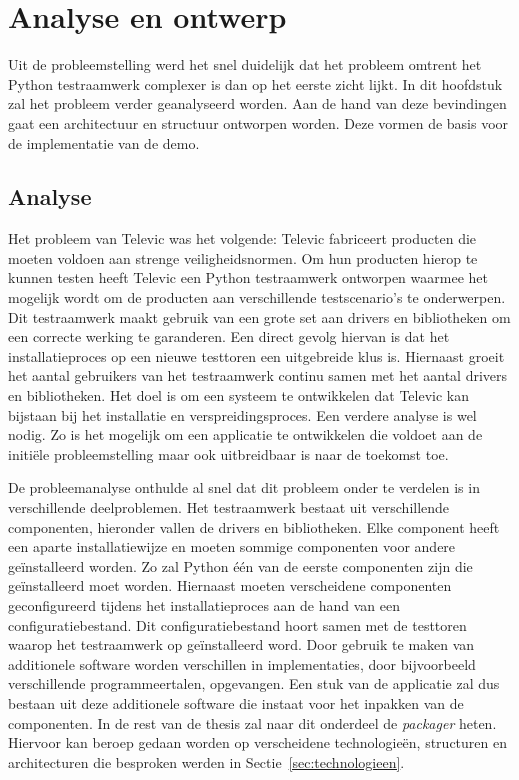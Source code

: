 \chapter{Analyse en ontwerp}\label{sec:anaEnOntwerp}
Uit de probleemstelling werd het snel duidelijk dat het probleem omtrent het Python testraamwerk complexer is dan op het eerste zicht lijkt.
In dit hoofdstuk zal het probleem verder geanalyseerd worden.
Aan de hand van deze bevindingen gaat een architectuur en structuur ontworpen worden.
Deze vormen de basis voor de implementatie van de demo.

\section{Analyse}
Het probleem van Televic was het volgende:
Televic fabriceert producten die moeten voldoen aan strenge veiligheidsnormen.
Om hun producten hierop te kunnen testen heeft Televic een Python testraamwerk ontworpen waarmee het mogelijk wordt om de producten aan verschillende testscenario's te onderwerpen.
Dit testraamwerk maakt gebruik van een grote set aan drivers en bibliotheken om een correcte werking te garanderen.
Een direct gevolg hiervan is dat het installatieproces op een nieuwe testtoren een uitgebreide klus is.
Hiernaast groeit het aantal gebruikers van het testraamwerk continu samen met het aantal drivers en bibliotheken.
Het doel is om een systeem te ontwikkelen dat Televic kan bijstaan bij het installatie en verspreidingsproces.
Een verdere analyse is wel nodig.
Zo is het mogelijk om een applicatie te ontwikkelen die voldoet aan de initiële probleemstelling maar ook uitbreidbaar is naar de toekomst toe.

De probleemanalyse onthulde al snel dat dit probleem onder te verdelen is in verschillende deelproblemen.
Het testraamwerk bestaat uit verschillende componenten, hieronder vallen de drivers en bibliotheken.
Elke component heeft een aparte installatiewijze en moeten sommige componenten voor andere geïnstalleerd worden.
Zo zal Python één van de eerste componenten zijn die geïnstalleerd moet worden.
Hiernaast moeten verscheidene componenten geconfigureerd tijdens het installatieproces aan de hand van een configuratiebestand.
Dit configuratiebestand hoort samen met de testtoren waarop het testraamwerk op geïnstalleerd word.
Door gebruik te maken van additionele software worden verschillen in implementaties, door bijvoorbeeld verschillende programmeertalen, opgevangen.
Een stuk van de applicatie zal dus bestaan uit deze additionele software die instaat voor het inpakken van de componenten.
In de rest van de thesis zal naar dit onderdeel de \emph{packager} heten.
Hiervoor kan beroep gedaan worden op verscheidene technologieën, structuren en architecturen die besproken werden in Sectie~\vref{sec:technologieen}.

